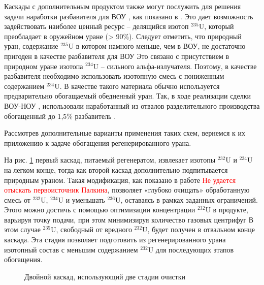 Каскады с дополнительным продуктом также могут послужить для решения задачи наработки разбавителя для ВОУ \cite{palkinPOLUChENIERAZBAVITELYaDLYa2017}, как показано в \cite{shopenSposobPolucheniyaRazbavitelya2008}.
Это дает возможность задействовать наиболее ценный ресурс -- делящийся изотоп $^{235}$U, который преобладает в оружейном уране (> 90\%).
Следует отметить, что природный уран, содержание $^{235}$U в котором намного меньше, чем в ВОУ, не достаточно пригоден в качестве разбавителя для ВОУ
Это связано с присутствием в природном уране изотопа $^{234}$U -- сильного альфа-излучателя.
Поэтому, в качестве разбавителя необходимо использовать изотопную смесь с пониженным содержанием $^{234}$U.
В качестве такого материала обычно используется предварительно обогащаемый обедненный уран.
Так, в ходе реализации сделки ВОУ-НОУ \cite{korotkevichRealizaciyaProgrammyVOUNOU2003}, использовали наработанный из отвалов разделительного производства обогащенный до 1,5\% разбавитель \cite{SposobPolucheniyaRazbavitelya}.

Рассмотрев дополнительные варианты применения таких схем, вернемся к их приложению к задаче обогащения регенерированного урана.

На рис. \ref{fig:double_palk} первый каскад, питаемый регенератом, извлекает изотопы $^{232}$U и $^{234}$U на легком конце, тогда как второй каскад дополнительно подпитывается природным ураном.
Такая модификация, как показано в работе \textcolor{red}{Не удается отыскать первоисточник Палкина}, позволяет «глубоко очищать» обработанную смесь от $^{232}$U, $^{234}$U и уменьшать  $^{236}$U, оставаясь в рамках заданных ограничений.
Этого можно достичь с помощью оптимизации концентрации $^{232}$U в продукте, варьируя точку подачи, при этом минимизируя количество газовых центрифуг
В этом случае $^{235}$U, свободный от вредного $^{232}$U, будет получен в отвальном конце каскада.
Эта стадия позволяет подготовить из регенерированного урана изотопный состав с меньшим содержанием $^{232}$U для последующих этапов обогащения.
\begin{figure}[ht]
  \caption{Двойной каскад, использующий две стадии очистки}\label{fig:double_palk}
\end{figure}

